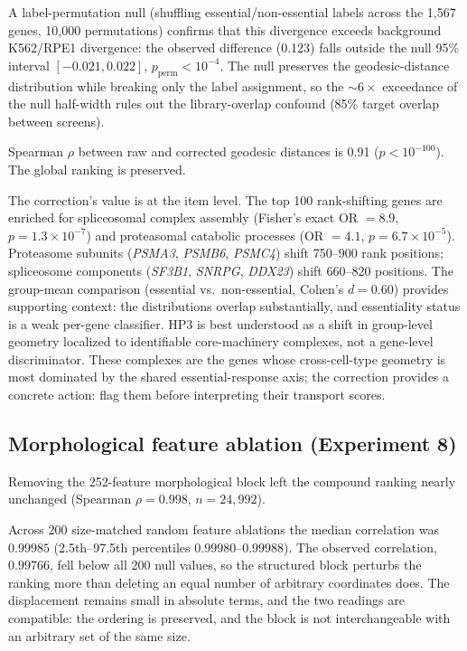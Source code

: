 \documentclass[11pt]{article}
\begin{document}
A label-permutation null (shuffling essential/non-essential labels across
the 1{,}567 genes, 10{,}000 permutations) confirms that this divergence
exceeds background K562/RPE1 divergence: the observed difference (0.123)
falls outside the null 95\% interval $[-0.021, 0.022]$,
$p_{\text{perm}} < 10^{-4}$. The null preserves the geodesic-distance
distribution while breaking only the label assignment, so the ${\sim}6\times$
exceedance of the null half-width rules out the library-overlap confound
(85\% target overlap between screens).

Spearman $\rho$ between raw and corrected geodesic distances is 0.91
($p < 10^{-100}$). The global ranking is preserved.

The correction's value is at the item level. The top 100 rank-shifting
genes are enriched for spliceosomal complex assembly (Fisher's exact
OR $= 8.9$, $p = 1.3 \times 10^{-7}$) and proteasomal catabolic
processes (OR $= 4.1$, $p = 6.7 \times 10^{-5}$). Proteasome subunits
(\emph{PSMA3}, \emph{PSMB6}, \emph{PSMC4}) shift 750--900 rank positions;
spliceosome components (\emph{SF3B1}, \emph{SNRPG}, \emph{DDX23}) shift
660--820 positions. The group-mean comparison (essential vs.\ non-essential,
Cohen's $d = 0.60$) provides supporting context: the distributions overlap
substantially, and essentiality status is a weak per-gene classifier.
HP3 is best understood as a shift in group-level geometry localized to
identifiable core-machinery complexes, not a gene-level discriminator.
These complexes are the genes whose cross-cell-type geometry is most
dominated by the shared essential-response axis; the correction provides a
concrete action: flag them before interpreting their transport scores.

\subsection{Morphological feature ablation (Experiment 8)}

Removing the 252-feature morphological block left the compound ranking nearly
unchanged (Spearman $\rho = 0.998$, $n = 24{,}992$).

Across 200 size-matched random feature ablations the median correlation was
$0.99985$ (2.5th--97.5th percentiles $0.99980$--$0.99988$). The observed
correlation, $0.99766$, fell below all 200 null values, so the structured block
perturbs the ranking more than deleting an equal number of arbitrary
coordinates does. The displacement remains small in absolute terms, and the two
readings are compatible: the ordering is preserved, and the block is not
interchangeable with an arbitrary set of the same size.
\end{document}
